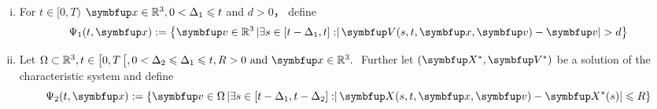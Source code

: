 \begin{definition}

\begin{enumerate}[(i)]

  \item For $t \in[0, T)$ $\vx \in \bbR^{3}, 0<\Delta_{1} \leqslant t$ and $d>0$， define
  \[
  \Psi_{1}(t, \vx):=\left\{\vv \in \bbR^{3}\left|\exists s \in\left[t-\Delta_{1}, t\right]:\right| \vect{V}(s, t, \vx, \vv)-\vv |>d\right\}
  \]





\item 
 Let $\Omega \subset \bbR^{3}, t \in\left[0, T\left[, 0<\Delta_{2} \leqslant \Delta_{1} \leqslant t, R>0 \text { and } \vx \in \bbR^{3}. \right.\right.$
Further let $(\vect{X}^*, \vect{V}^*)$ be a solution of the characteristic system and define
\[
\Psi_{2}(t, \vx):=\left\{\vv \in \Omega\left|\exists s \in\left[t-\Delta_{1}, t-\Delta_{2}\right]:\right| \vect{X}(s, t, \vx, \vv)-\vect{X}^*(s) | \leqslant R\right\}
\]


\end{enumerate}

\end{definition}

